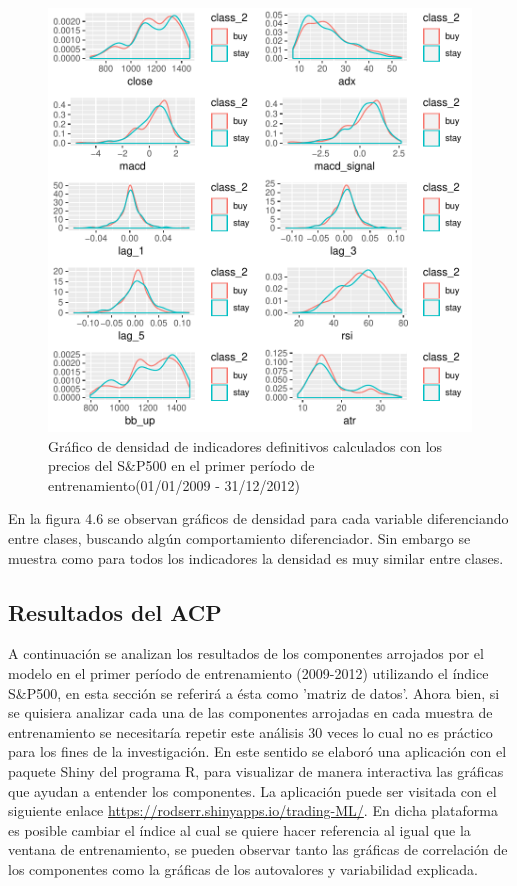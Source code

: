 \documentclass[a4paper,12pt]{Latex/Classes/PhDthesisPSnPDF}
\begin{document}
\begin{figure}[H]
\centering
\includegraphics{main-011}
\caption{Gráfico de densidad de indicadores definitivos calculados con los precios del S\&P500 en el primer período de entrenamiento(01/01/2009 - 31/12/2012)}
\end{figure}

En la figura 4.6 se observan gráficos de densidad para cada variable diferenciando entre clases, buscando algún comportamiento diferenciador. Sin embargo se muestra como para todos los indicadores la densidad es muy similar entre clases.

\subsection{Resultados del ACP}

A continuación se analizan los resultados de los componentes arrojados por el modelo en el primer período de entrenamiento (2009-2012) utilizando el índice S\&P500, en esta sección se referirá a ésta como 'matriz de datos'. Ahora bien, si se quisiera analizar cada una de las componentes arrojadas en cada muestra de entrenamiento se necesitaría repetir este análisis 30 veces lo cual no es práctico para los fines de la investigación. En este sentido se elaboró una aplicación con el paquete Shiny del programa R, para visualizar de manera interactiva las gráficas que ayudan a entender los componentes. La aplicación puede ser visitada con el siguiente enlace \url{https://rodserr.shinyapps.io/trading-ML/}. En dicha plataforma es posible cambiar el índice al cual se quiere hacer referencia al igual que la ventana de entrenamiento, se pueden observar tanto las gráficas de correlación de los componentes como la gráficas de los autovalores y variabilidad explicada.
\end{document}
